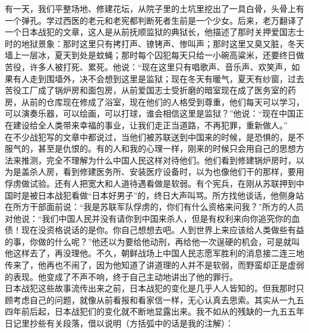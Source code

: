 有一天，我们平整场地、修建花坛，从院子里的土坑里挖出了一具白骨，头骨上有一个弹孔。学过西医的老元和老宪都判断死者生前是一个少女。后来，老万翻译了一个日本战犯的文章，这人是从前抚顺监狱的典狱长，他描述了那时关押爱国志士时的地狱景象：那时这里只有拷打声、镣铐声、惨叫声；那时这里又臭又脏，冬天墙上一层冰，夏天到处是蚊蝇；那时每个囚犯每天只给一小碗高粱米，还要终日做苦役，许多人被打死、累死。他说：“现在这里只有唱歌声、音乐声、欢笑声，如果有人走到围墙外，决不会想到这里是监狱；现在冬天有暖气，夏天有纱窗，过去苦役工厂成了锅炉房和面包房，从前爱国志士受折磨的暗室现在成了医务室的药房，从前的仓库现在修成了浴室，现在他们的人格受到尊重，他们每天可以学习，可以演奏乐器，可以绘画，可以打球，谁会相信这里是监狱？”他说：“现在中国正在建设给全人类带来幸福的事业，让我们走正当道路，不再犯罪，重新做人。”\\

在不少战犯写的文章中都说过，当他们被苏联送到中国来的时候，是恐惧的，是不服气的，甚至是仇恨的。有的人和我的心理一样，刚来的时候只会用自己的思想方法来推测，完全不理解为什么中国人民这样对待他们。他们看到修建锅炉房时，以为是盖杀人房，看到修建医务所、安装医疗设备时，以为也像他们干的那样，要用俘虏做试验。还有人把宽大和人道待遇看做是软弱。有个宪兵，在刚从苏联押到中国时是被日本战犯看做“日本好男子”的，终日大声叫骂。所方找他谈话，他侧身站在所方干部面前说：“我是苏联军队俘虏的，你们有什么资格来问我？”所方的人员对他说：“我们中国人民并没有请你到中国来杀人，但是有权利来向你追究你的血债！现在没资格说话的是你。你自己想想去吧。人到世界上来应该给人类做些有益的事，你做的什么呢？”他还以为要给他动刑，再给他一次逞硬的机会，可是就叫他这样去了，再没理他。不久，朝鲜战场上中国人民志愿军胜利的消息接二连三地传来了，他再也不闹了，因为他知道了讲道理的人并不是软弱，而野蛮却正是虚弱的表现。他变成了不声不响，终于自己主动地讲出了他的罪行。\\

日本战犯这些故事流传出来之前，日本战犯的变化是几乎人人皆知的。但我那时只顾考虑自己的问题，就像从前看报和看家信一样，无心认真去思索。其实从一九五四年前后起，日本战犯们的变化就不断地显露出来。我不如从的残缺的一九五五年日记里抄些有关段落，借以说明（方括弧中的话是我的注解）：\\

